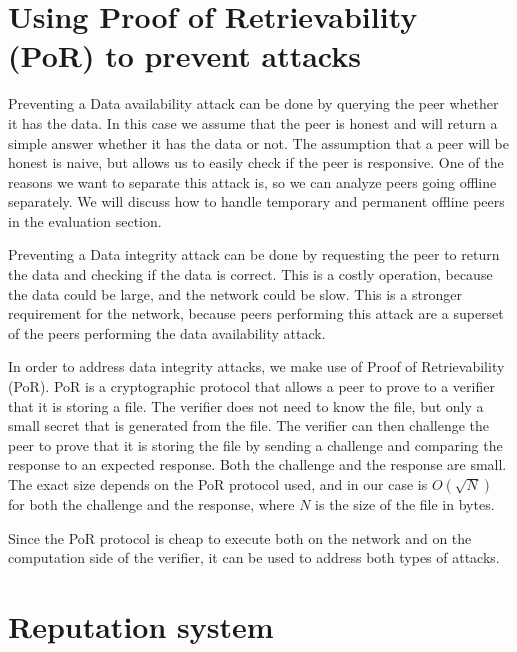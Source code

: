 \section{Using Proof of Retrievability (PoR) to prevent attacks}

Preventing a Data availability attack can be done by querying the peer whether it has the data.
In this case we assume that the peer is honest and will return a simple answer whether it has the data or not.
The assumption that a peer will be honest is naive, but allows us to easily check if the peer is responsive.
One of the reasons we want to separate this attack is, so we can analyze peers going offline separately.
We will discuss how to handle temporary and permanent offline peers in the evaluation section.

Preventing a Data integrity attack can be done by requesting the peer to return the data and checking if
the data is correct.
This is a costly operation, because the data could be large, and the network could be slow.
This is a stronger requirement for the network, because peers performing this attack are a superset
of the peers performing the data availability attack.

In order to address data integrity attacks, we make use of Proof of Retrievability (PoR).
PoR is a cryptographic protocol that allows a peer to prove to a verifier that it is storing a file.
The verifier does not need to know the file, but only a small secret that is generated from the file.
The verifier can then challenge the peer to prove that it is storing the file by sending a challenge and
comparing the response to an expected response.
Both the challenge and the response are small.
The exact size depends on the PoR protocol used, and in our case is $O(\sqrt{N})$ \cite{poralgebra} for
both the challenge and the response, where $N$ is the size of the file in bytes.

Since the PoR protocol is cheap to execute both on the network and on the computation side of the verifier,
it can be used to address both types of attacks.

\section{Reputation system}

